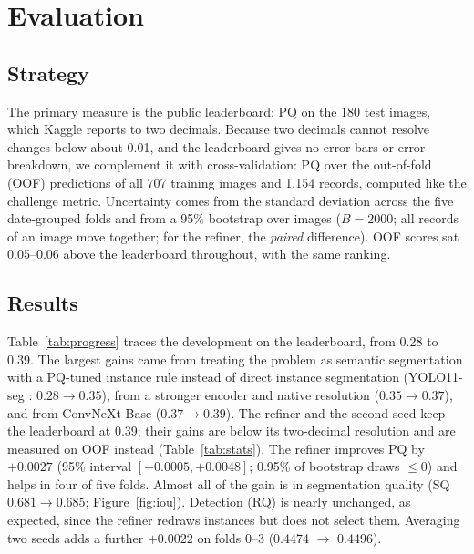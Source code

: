 \documentclass[sigconf]{acmart}
\begin{document}
\section{Evaluation}\label{sec:evaluation}

\subsection{Strategy}
    The primary measure is the public leaderboard: PQ on the 180 test images, which Kaggle reports to two decimals. Because two decimals cannot resolve changes below about 0.01, and the leaderboard gives no error bars or error breakdown, we complement it with cross-validation: PQ over the out-of-fold (OOF) predictions of all 707 training images and 1,154 records, computed like the challenge metric. Uncertainty comes from the standard deviation across the five date-grouped folds and from a 95\% bootstrap over images ($B=2000$; all records of an image move together; for the refiner, the \emph{paired} difference). OOF scores sat 0.05--0.06 above the leaderboard throughout, with the same ranking.

\subsection{Results}
    Table~\ref{tab:progress} traces the development on the leaderboard, from 0.28 to 0.39. The largest gains came from treating the problem as semantic segmentation with a PQ-tuned instance rule instead of direct instance segmentation (YOLO11-seg \cite{yolo11}: $0.28\rightarrow0.35$), from a stronger encoder and native resolution ($0.35\rightarrow0.37$), and from ConvNeXt-Base ($0.37\rightarrow0.39$). The refiner and the second seed keep the leaderboard at 0.39; their gains are below its two-decimal resolution and are measured on OOF instead (Table~\ref{tab:stats}). The refiner improves PQ by $+0.0027$ (95\% interval $[+0.0005, +0.0048]$; 0.95\% of bootstrap draws $\leq 0$) and helps in four of five folds. Almost all of the gain is in segmentation quality (SQ $0.681\rightarrow0.685$; Figure~\ref{fig:iou}). Detection (RQ) is nearly unchanged, as expected, since the refiner redraws instances but does not select them. Averaging two seeds adds a further $+0.0022$ on folds 0--3 (0.4474 $\rightarrow$ 0.4496).
\end{document}
